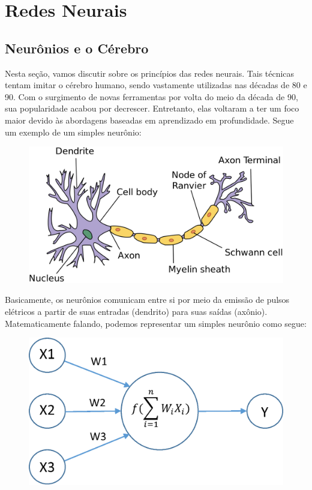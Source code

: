 \section{Redes Neurais}
\label{s.neural_networks}

\subsection{Neurônios e o Cérebro}

Nesta seção, vamos discutir sobre os princípios das redes neurais. Tais técnicas tentam imitar o cérebro humano, sendo vastamente utilizadas nas décadas de 80 e 90. Com o surgimento de novas ferramentas por volta do meio da década de 90, sua popularidade acabou por decrescer. Entretanto, elas voltaram a ter um foco maior devido às abordagens baseadas em aprendizado em profundidade. Segue um exemplo de um simples neurônio:

\begin{figure}[!h]
\centering
\includegraphics[scale=0.25]{figs/neuron.png}
\label{f.neuron}
\end{figure}

Basicamente, os neurônios comunicam entre si por meio da emissão de pulsos elétricos a partir de suas entradas (dendrito) para suas saídas (axônio). Matematicamente falando, podemos representar um simples neurônio como segue:

\begin{figure}[!h]
\centering
\includegraphics[scale=0.30]{figs/simple_neural_network.png}
\label{f.simples_neural_network}
\end{figure}

